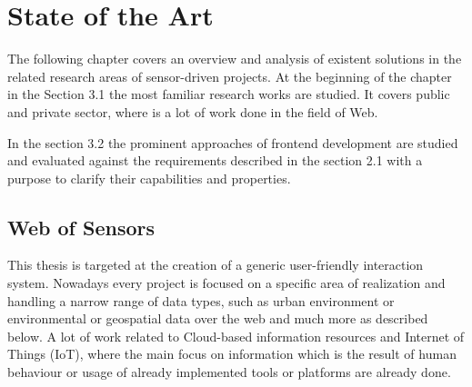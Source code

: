 \chapter{State of the Art}
The following chapter covers an overview and analysis of existent solutions in the related research areas of sensor-driven projects. At the beginning of the chapter in the Section 3.1 the most familiar research works are studied. It covers public and private sector, where is a lot of work done in the field of Web.

In the section 3.2 the prominent approaches of frontend development are studied and evaluated against the requirements described in the section 2.1 with a purpose to clarify their capabilities and properties.  

\section{Web of Sensors}
 This thesis is targeted at the creation of a generic user-friendly interaction system. Nowadays every project is focused on a specific area of realization and handling a narrow range of data types, such as urban environment\cite{song2010real} or environmental or geospatial data over the web\cite{6588063} and much more as described below. A lot of work related to Cloud-based information resources and Internet of Things (IoT), where the main focus on information which is the result of human behaviour or usage of already implemented tools or platforms are already done.  

